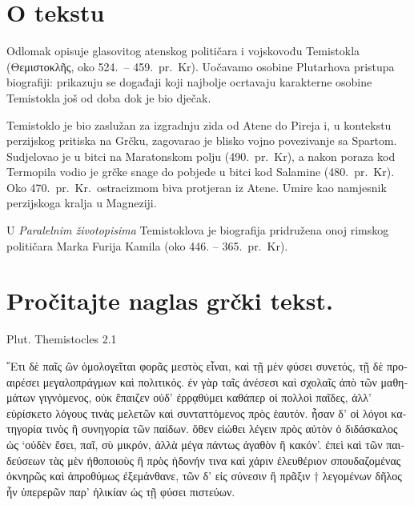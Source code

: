 


\section*{O tekstu}

Odlomak opisuje glasovitog atenskog političara i vojskovođu Temistokla \textgreek[variant=ancient]{(Θεμιστοκλῆς}, oko 524.\ – 459.\ pr.~Kr). Uočavamo osobine Plutarhova pristupa biografiji: prikazuju se događaji koji najbolje ocrtavaju karakterne osobine Temistokla još od doba dok je bio dječak. 

Temistoklo je bio zaslužan za izgradnju zida od Atene do Pireja i, u kontekstu perzijskog pritiska na Grčku, zagovarao je blisko vojno povezivanje sa Spartom. Sudjelovao je u bitci na Maratonskom polju (490.\ pr.~Kr), a nakon poraza kod Termopila vodio je grčke snage do pobjede u bitci kod Salamine (480.\ pr.~Kr). Oko 470.\ pr.~Kr.\ ostracizmom biva protjeran iz Atene. Umire kao namjesnik perzijskoga kralja u Magneziji. 

U \textit{Paralelnim životopisima} Temistoklova je biografija pridružena onoj rimskog političara Marka Furija Kamila (oko 446. – 365.\ pr.~Kr). 


\section*{Pročitajte naglas grčki tekst.}
Plut. Themistocles 2.1

\medskip

{\large
\begin{greek}
\noindent ῎Ετι δὲ παῖς ὢν ὁμολογεῖται φορᾶς μεστὸς εἶναι, καὶ τῇ μὲν φύσει συνετός, τῇ δὲ προαιρέσει μεγαλοπράγμων καὶ πολιτικός. ἐν γὰρ ταῖς ἀνέσεσι καὶ σχολαῖς ἀπὸ τῶν μαθημάτων γιγνόμενος, οὐκ ἔπαιζεν οὐδ' ἐρρᾳθύμει καθάπερ οἱ πολλοὶ παῖδες, ἀλλ' εὑρίσκετο λόγους τινὰς μελετῶν καὶ συνταττόμενος πρὸς ἑαυτόν. ἦσαν δ' οἱ λόγοι κατηγορία τινὸς ἢ συνηγορία τῶν παίδων. ὅθεν εἰώθει λέγειν πρὸς αὐτὸν ὁ διδάσκαλος ὡς ‘οὐδὲν ἔσει, παῖ, σὺ μικρόν, ἀλλὰ μέγα πάντως ἀγαθὸν ἢ κακόν’. ἐπεὶ καὶ τῶν παιδεύσεων τὰς μὲν ἠθοποιοὺς ἢ πρὸς ἡδονήν τινα καὶ χάριν ἐλευθέριον σπουδαζομένας ὀκνηρῶς καὶ ἀπροθύμως ἐξεμάνθανε, τῶν δ' εἰς σύνεσιν ἢ πρᾶξιν † λεγομένων δῆλος ἦν ὑπερερῶν παρ' ἡλικίαν ὡς τῇ φύσει πιστεύων.

\end{greek}
}

